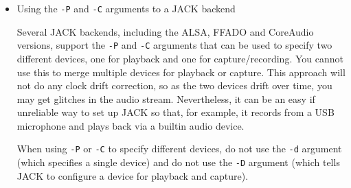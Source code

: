 \documentclass[10pt,a4paper]{book}
\begin{document}
\begin{enumerate}
\begin{itemize}
\item Using the \texttt{-P} and \texttt{-C} arguments to a JACK backend

Several JACK backends, including the ALSA, FFADO and CoreAudio
versions, support the \texttt{-P} and \texttt{-C} arguments that can
be used to specify two different devices, one for playback and one for
capture/recording. You cannot use this to merge multiple devices for
playback or capture. This approach will not do any clock drift
correction, so as the two devices drift over time, you may get
glitches in the audio stream. Nevertheless, it can be an easy if
unreliable way to set up JACK so that, for example, it records from a
USB microphone and plays back via a builtin audio device.

When using \texttt{-P} or \texttt{-C} to specify different devices, do
not use the \texttt{-d} argument (which specifies a single device) and
do not use the \texttt{-D} argument (which tells JACK to configure a
device for playback and capture).

\end{itemize}
\end{enumerate}
\end{document}
